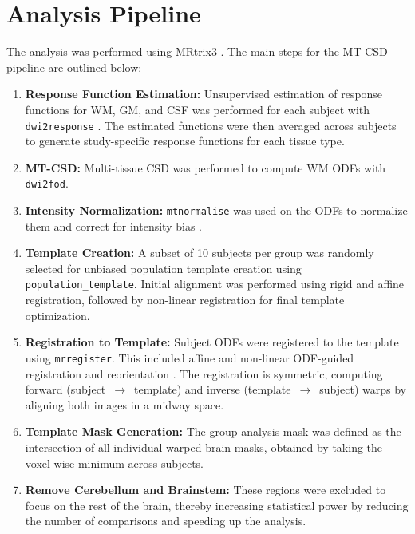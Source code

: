 \section{Analysis Pipeline}

The analysis was performed using MRtrix3 \cite{Tournier2019}. The main steps for the MT-CSD pipeline are outlined below:

\begin{enumerate}
    \item \textbf{Response Function Estimation:} Unsupervised estimation of response functions for WM, GM, and CSF was performed for each subject with \texttt{dwi2response} \cite{raffelt2019}. The estimated functions were then averaged across subjects to generate study-specific response functions for each tissue type.

    \item \textbf{MT-CSD:} Multi-tissue CSD was performed to compute WM ODFs with \texttt{dwi2fod}\cite{Jeurissen2014}.

    \item \textbf{Intensity Normalization:} \texttt{mtnormalise} was used on the ODFs to normalize them and correct for intensity bias \cite{Dhollander21}.

    \item \textbf{Template Creation:} A subset of 10 subjects per group was randomly selected for unbiased population template creation using \texttt{population\_template}. Initial alignment was performed using rigid and affine registration, followed by non-linear registration for final template optimization.

    \item \textbf{Registration to Template:} Subject ODFs were registered to the template using \texttt{mrregister}. This included affine and non-linear ODF-guided registration and reorientation \cite{Raffelt12}. The registration is symmetric, computing forward (subject~$\rightarrow$~template) and inverse (template~$\rightarrow$~subject) warps by aligning both images in a midway space.

    \item \textbf{Template Mask Generation:} The group analysis mask was defined as the intersection of all individual warped brain masks, obtained by taking the voxel-wise minimum across subjects.

    \item \textbf{Remove Cerebellum and Brainstem:} These regions were excluded to focus on the rest of the brain, thereby increasing statistical power by reducing the number of comparisons and speeding up the analysis.


\end{enumerate}
